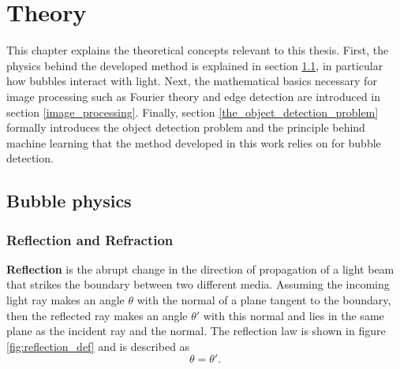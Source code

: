 \chapter{Theory}\label{theory}
This chapter explains the theoretical concepts relevant to this thesis. First, the physics behind the developed method is explained in section \ref{bubble_physics}, in particular how bubbles interact with light.
Next, the mathematical basics necessary for image processing such as Fourier theory and edge detection are introduced in section \ref{image_processing}. Finally, section \ref{the_object_detection_problem} formally introduces the object detection problem and the principle behind machine learning that the method developed in this work relies on for bubble detection.

	\section{Bubble physics} \label{bubble_physics}

		\subsection{Reflection and Refraction}
			\textbf{Reflection} is the abrupt change in the direction of propagation of a light beam that strikes the boundary between two different media. Assuming the incoming light ray makes an angle $\theta$ with the normal of a plane tangent to the boundary, then the reflected ray makes an angle $\theta'$ with this normal and lies in the same plane as the incident ray and the normal. The reflection law is shown in figure \ref{fig:reflection_def} and is described as
			\begin{equation}
				\theta = \theta'.
			\end{equation}
			
